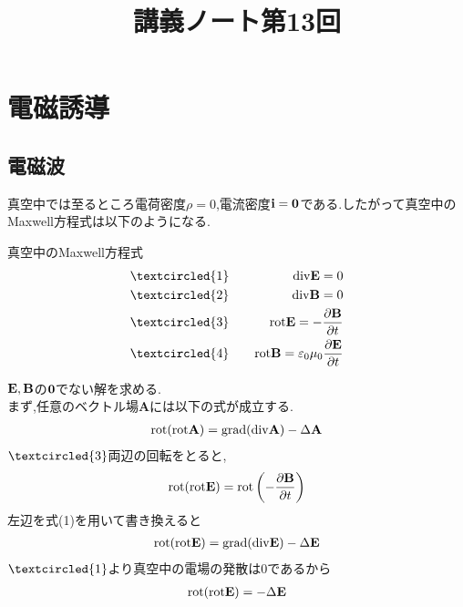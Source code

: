 \documentclass{jsarticle}
\title{講義ノート第13回}
\author{}
\date{}
\begin{document}
\maketitle

\setcounter{section}{2}

\section{電磁誘導}

\setcounter{subsection}{4}

\subsection{電磁波}
真空中では至るところ電荷密度$\rho=0$,電流密度${\bf i}={\bf 0}$である.したがって真空中のMaxwell方程式は以下のようになる. \\
\begin{itembox}[c]{真空中のMaxwell方程式}
\begin{eqnarray*}
&\textcircled{\scriptsize 1}& \quad {\rm div}{\bf E}=0 \\
&\textcircled{\scriptsize 2}& \quad {\rm div}{\bf B}=0 \\
&\textcircled{\scriptsize 3}& \quad {\rm rot}{\bf E}=-\frac{\partial {\bf B}}{\partial t} \\
&\textcircled{\scriptsize 4}& \quad {\rm rot}{\bf B}= \varepsilon_0 \mu_0   \frac{\partial {\bf E}}{\partial t}
\end{eqnarray*}
\end{itembox}
${\bf E},{\bf B}$の${\bf 0}$でない解を求める. \\
まず,任意のベクトル場{\bf A}には以下の式が成立する.
\begin{eqnarray}
{\rm rot}({\rm rot}{\bf A}) = {\rm grad}({\rm div}{\bf A}) - \Delta {\bf A}
\end{eqnarray}
$\textcircled{\scriptsize 3}$両辺の回転をとると,
\begin{eqnarray*}
{\rm rot}({\rm rot}{\bf E}) = {\rm rot} \left( -\frac{\partial {\bf B}}{\partial t} \right)
\end{eqnarray*}
左辺を式(1)を用いて書き換えると
\begin{eqnarray*}
{\rm rot}({\rm rot}{\bf E}) = {\rm grad}({\rm div}{\bf E}) - \Delta {\bf E}
\end{eqnarray*}
$\textcircled{\scriptsize 1}$より真空中の電場の発散は0であるから
\begin{eqnarray*}
{\rm rot}({\rm rot}{\bf E}) = - \Delta {\bf E}
\end{eqnarray*}
\end{document}
